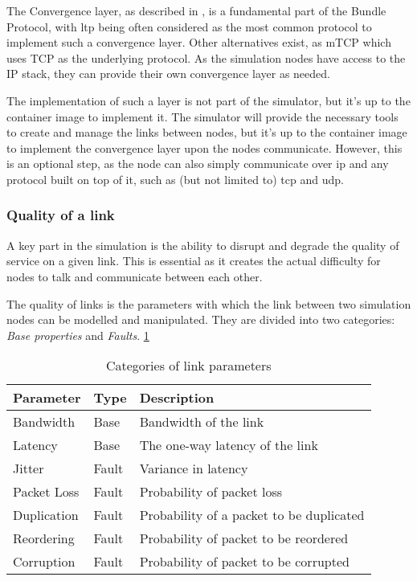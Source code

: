 The Convergence layer, as described in \cite{RFC9171}, is a fundamental part of the Bundle Protocol, with \ac{ltp} being often considered as the most common protocol to implement such a convergence layer. Other alternatives exist, as mTCP \cite{ietf-dtn-mtcpcl-01} which uses TCP as the underlying protocol.
As the simulation nodes have access to the IP stack, they can provide their own convergence layer as needed.

The implementation of such a layer is not part of the simulator, but it's up to the container image to implement it. The simulator will provide the necessary tools to create and manage the links between nodes, but it's up to the container image to implement the convergence layer upon the nodes communicate. However, this is an optional step, as the node can also simply communicate over \ac{ip} and any protocol built on top of it, such as (but not limited to) \ac{tcp} and \ac{udp}.

\subsubsection{Quality of a link} \label{link-quality}

A key part in the simulation is the ability to disrupt and degrade the quality of service on a given link. This is essential as it creates the actual difficulty for nodes to talk and communicate between each other.

The quality of links is the parameters with which the link between two simulation nodes can be modelled and manipulated. They are divided into two categories: \textit{Base properties} and \textit{Faults}. \ref{table:link-parameters}

\begin{table}[H]
  \centering
  \begin{tabular}{|l|l|l|}
    \hline
    Parameter   & Type  & Description                              \\
    \hline\hline
    Bandwidth   & Base  & Bandwidth of the link                    \\
    Latency     & Base  & The one-way latency of the link          \\
    Jitter      & Fault & Variance in latency                      \\
    Packet Loss & Fault & Probability of packet loss               \\
    Duplication & Fault & Probability of a packet to be duplicated \\
    Reordering  & Fault & Probability of packet to be reordered    \\
    Corruption  & Fault & Probability of packet to be corrupted    \\
    \hline
  \end{tabular}
  \caption{Categories of link parameters}
  \label{table:link-parameters}
\end{table}

